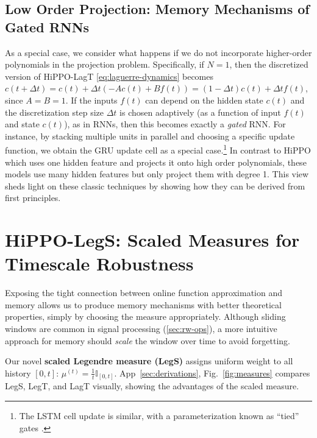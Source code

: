 \documentclass{article}
\begin{document}
\subsection{Low Order Projection: Memory Mechanisms of Gated RNNs}
\label{subsec:low_order_projection}

As a special case, we consider what happens if we do not incorporate higher-order polynomials in the projection problem.
Specifically, if $N=1$, then the discretized version of HiPPO-LagT \eqref{eq:laguerre-dynamics} becomes
$c(t + \Delta t) = c(t) + \Delta t(-Ac(t) + Bf(t)) = (1 - \Delta t)c(t) + \Delta t f(t)$, since $A = B = 1$.
If the inputs $f(t)$ can depend on the hidden state $c(t)$ and the discretization step size $\Delta t$ is chosen adaptively (as a function of input $f(t)$ and state $c(t)$),
as in RNNs, then this becomes exactly a \emph{gated} RNN.
For instance, by stacking multiple units in parallel and choosing a specific update function,
we obtain the GRU update cell as a special case.\footnote{The LSTM cell update is similar, with a parameterization known as ``tied'' gates \cite{greff2016lstm}.}
In contrast to HiPPO which uses one hidden feature and projects it onto high order polynomials,
these models use many hidden features but only project them with degree 1.
This view sheds light on these classic techniques by showing how they can be derived from first principles.



 

\section{HiPPO-LegS: Scaled Measures for Timescale Robustness}
\label{sec:theory_legs}

Exposing the tight connection between online function approximation and memory allows us to produce memory mechanisms with better theoretical properties, simply by choosing the measure appropriately.
Although sliding windows are common in signal processing (\cref{sec:rw-ops}), a more intuitive approach for memory should \emph{scale} the window over time to avoid forgetting.

Our novel \textbf{scaled Legendre measure (LegS)} assigns uniform weight to all history $[0, t]$:
$\mu^{(t)} = \frac{1}{t} \mathbb{I}_{[0, t]}$. App~\ref{sec:derivations}, Fig.~\ref{fig:measures} compares LegS, LegT, and LagT visually, showing the advantages of the scaled measure.
\end{document}
